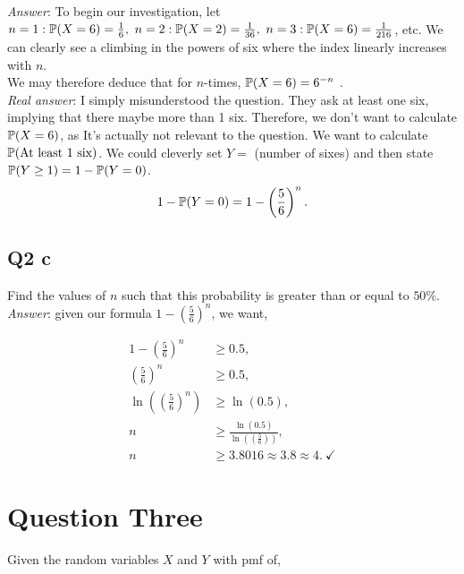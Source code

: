 \documentclass{article}
\begin{document}
            \textit{Answer}: To begin our investigation, let $n = 1 : \mathbb{P}(X = 6) = \frac{1}{6},~ n=2 : \mathbb{P}(X = 2) = \frac{1}{36},~ n=3: \mathbb{P}(X = 6) = \frac{1}{216}$, etc. We can clearly see a climbing in the powers of six where the index linearly increases with $n$.\\ 
            
            We may therefore deduce that for $n$-times, $\mathbb{P}(X=6) = 6^{-n}$ \xmark.\\

            \textit{Real answer}: I simply misunderstood the question. They ask at least one six, implying that there maybe more than 1 six. Therefore, we don't want to calculate $\mathbb{P}(X = 6)$, as It's actually not relevant to the question. We want to calculate $\mathbb{P}(\text{At least 1 six})$. We could cleverly set $Y =$ (number of sixes) and then state $\mathbb{P}(Y \geq 1) = 1 - \mathbb{P}(Y = 0)$.\\

            \[1 - \mathbb{P}(Y = 0) = 1 - \left( \frac{5}{6} \right)^n.\]

        \subsection{Q2 c}
            Find the values of $n$ such that this probability is greater than or equal to $50\%$.\\

            \textit{Answer}: given our formula $1 - \left( \frac{5}{6} \right)^n$, we want,

            \begin{align*}
                1 - \left( \frac{5}{6} \right)^n &\geq 0.5,\\
                \left( \frac{5}{6} \right)^n&\geq 0.5,\\
                \ln\left( \left( \frac{5}{6} \right)^n \right)&\geq \ln(0.5),\\
                n&\geq\frac{\ln(0.5)}{\ln\left( \left( \frac{5}{6} \right)\right)},\\
                n&\geq3.8016 \approx 3.8 \approx 4. ~\checkmark
            \end{align*}

    \section{Question Three}
        Given the random variables $X$ and $Y$ with pmf of,
\end{document}

